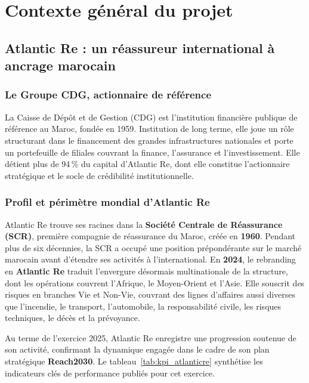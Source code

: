 \documentclass[../main.tex]{subfiles}
\begin{document}
\chapter{Contexte général du projet}
\label{chap:contexte}

\section{Atlantic Re : un réassureur international à ancrage marocain}

\subsection{Le Groupe CDG, actionnaire de référence}

La Caisse de Dépôt et de Gestion (CDG) est l'institution financière publique de
référence au Maroc, fondée en 1959. Institution de long terme, elle joue un rôle
structurant dans le financement des grandes infrastructures nationales et porte un
portefeuille de filiales couvrant la finance, l'assurance et l'investissement. Elle
détient plus de 94\,\% du capital d'Atlantic Re, dont elle constitue l'actionnaire
stratégique et le socle de crédibilité institutionnelle.

\subsection{Profil et périmètre mondial d'Atlantic Re}

Atlantic Re trouve ses racines dans la \textbf{Société Centrale de Réassurance
(SCR)}, première compagnie de réassurance du Maroc, créée en \textbf{1960}. Pendant
plus de six décennies, la SCR a occupé une position prépondérante sur le marché
marocain avant d'étendre ses activités à l'international. En \textbf{2024}, le
rebranding en \textbf{Atlantic Re} traduit l'envergure désormais multinationale de
la structure, dont les opérations couvrent l'Afrique, le Moyen-Orient et l'Asie.
Elle souscrit des risques en branches Vie et Non-Vie, couvrant des lignes d'affaires
aussi diverses que l'incendie, le transport, l'automobile, la responsabilité civile,
les risques techniques, le décès et la prévoyance.

Au terme de l'exercice 2025, Atlantic Re enregistre une progression soutenue de son
activité, confirmant la dynamique engagée dans le cadre de son plan stratégique
\textbf{Reach2030}. Le tableau~\ref{tab:kpi_atlanticre} synthétise les indicateurs
clés de performance publiés pour cet exercice.
\end{document}
